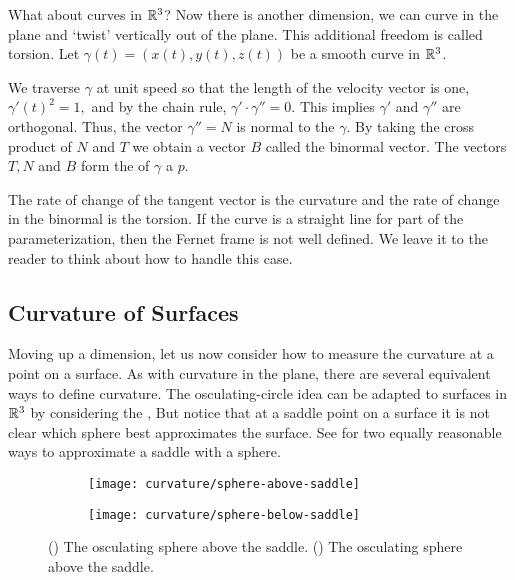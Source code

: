 What about curves in $\mathbb{R}^3$? Now there is another dimension, we can curve in the plane
and `twist' vertically out of the plane.
This additional freedom is called torsion.
Let $\gamma(t)=(x(t),y(t),z(t))$ be a smooth curve in $\mathbb{R}^3$.


We traverse $\gamma$
at unit speed so that the length of the velocity vector is one, $\gamma'(t)^2=1,$ and by the chain rule, $\gamma'\cdot \gamma''=0$.
This implies $\gamma'$ and $\gamma''$ are orthogonal.
Thus, the
vector $\gamma''=N$ is normal to the $\gamma$. 
By taking the cross product of $N$ and $T$ we obtain a vector $B$ called
the binormal vector.
The vectors $T,N$ and $B$ form the  of $\gamma$ a $p.$


The rate of change of the tangent vector is the curvature and the rate of change in
the binormal is the torsion. If the curve is a straight line for part of the parameterization,
then the Fernet frame is not well defined. We leave it to the reader to think about how to handle
this case.

\subsection{Curvature of Surfaces}


Moving up a dimension, let us now consider how to measure
the curvature at a point on a surface. As with curvature in the plane,
there are several equivalent ways to define curvature.
 The osculating-circle idea can be adapted
 to  surfaces in $\mathbb{R}^3$ by considering the ,
But notice that at a saddle point on a surface it is not clear which sphere
best approximates the surface. See  for two
equally reasonable ways to approximate a saddle with a sphere.

\begin{figure}[htb]
    \captionsetup[subfigure]{justification=centering}
    \centering
    \begin{subfigure}[b]{0.25\textwidth}
        \texttt{[image: curvature/sphere-above-saddle]}
       \subcaption{}\label{fig:sphere-above-saddle}
    \end{subfigure}
        \hspace{1cm}
        \begin{subfigure}[b]{0.25\textwidth}
        \texttt{[image: curvature/sphere-below-saddle]}
        \subcaption{}\label{fig:sphere-below-saddle}
        \end{subfigure}
    \caption{() The osculating sphere above the saddle.
        () The osculating sphere above the saddle.
    }
    \label{fig:osculating-sphere}
\end{figure}


